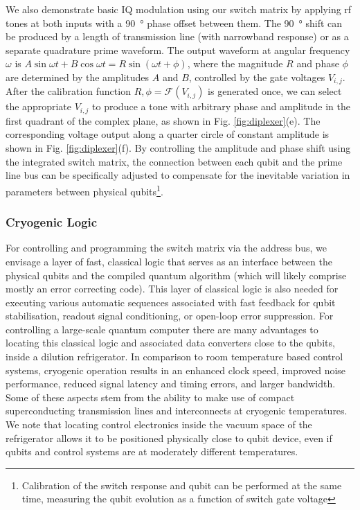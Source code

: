 We also demonstrate basic IQ modulation using our switch matrix by applying rf tones at both inputs with a \SI{90}{\degree} phase offset between them. The \SI{90}{\degree} shift can be produced by a length of transmission line (with narrowband response) or as a separate quadrature prime waveform. The output waveform at angular frequency $\omega$ is $A \sin \omega t + B \cos \omega t = R \sin (\omega t + \phi)$, where the magnitude $R$ and phase $\phi$ are determined by the amplitudes $A$ and $B$, controlled by the gate voltages $V_{i,j}$. After the calibration function $R, \phi = \mathcal{F} (V_{i,j})$ is generated once, we can select the appropriate $V_{i,j}$ to produce a tone with arbitrary phase and amplitude in the first quadrant of the complex plane, as shown in Fig. \ref{fig:diplexer}(e). The corresponding voltage output along a quarter circle of constant amplitude is shown in Fig. \ref{fig:diplexer}(f). By controlling the amplitude and phase shift using the integrated switch matrix, the connection between each qubit and the prime line bus can be specifically adjusted to compensate for the inevitable variation in parameters between physical qubits\footnote{Calibration of the switch response and qubit can be performed at the same time, measuring the qubit evolution as a function of switch gate voltage}.

\subsubsection{Cryogenic Logic}
For controlling and programming the switch matrix via the address bus, we envisage a layer of fast, classical logic that serves as an interface between the physical qubits and the compiled quantum algorithm (which will likely comprise mostly an error correcting code). This layer of classical logic is also needed for executing various automatic sequences associated with fast feedback for qubit stabilisation, readout signal conditioning, or open-loop error suppression\cite{PhysRevLett.90.037901,ncomms6156}. For controlling a large-scale quantum computer there are many advantages to locating this classical logic and associated data converters close to the qubits, inside a dilution refrigerator. In comparison to room temperature based control systems, cryogenic operation results in an enhanced clock speed, improved noise performance, reduced signal latency and timing errors, and larger bandwidth. Some of these aspects stem from the ability to make use of compact superconducting transmission lines and interconnects at cryogenic temperatures. We note that locating control electronics inside the vacuum space of the refrigerator allows it to be positioned physically close to qubit device, even if qubits and control systems are at moderately different temperatures.

